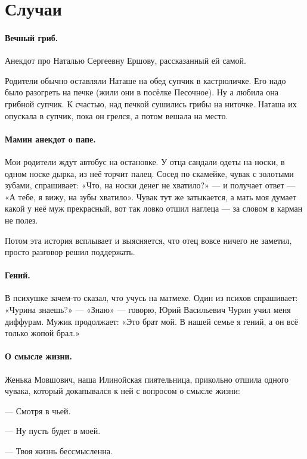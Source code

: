 \documentclass{book}
\begin{document}
\section*{Случаи}

\paragraph{Вечный гриб.}
Анекдот про Наталью Сергеевну Ершову, рассказанный ей самой.

Родители обычно оставляли Наташе на обед супчик в кастрюличке.
Его надо было разогреть на печке (жили они в посёлке Песочное).
Ну а любила она грибной супчик.
К счастью, над печкой сушились грибы на ниточке.
Наташа их опускала в супчик, пока он грелся, а потом вешала на место.

\paragraph{Мамин анекдот о папе.}
Мои родители ждут автобус на остановке.
У отца сандали одеты на носки, в одном носке дырка, из неё торчит палец.
Сосед по скамейке, чувак с золотыми зубами, спрашивает: «Что, на носки денег не хватило?» --- и получает ответ --- «А тебе, я вижу, на зубы хватило».
Чувак тут же затыкается, а мать моя думает какой у неё муж прекрасный, вот так ловко отшил наглеца --- за словом в карман не полез.

Потом эта история всплывает и выясняется, что отец вовсе ничего не заметил, просто разговор решил поддержать.

\paragraph{Гений.}
В психушке зачем-то сказал, что учусь на матмехе.
Один из психов спрашивает: «Чурина знаешь?» — «Знаю» — говорю, Юрий Васильевич Чурин учил меня диффурам.
Мужик продолжает: «Это брат мой. В нашей семье я гений, а он всё только жопой брал.»


\paragraph{О смысле жизни.}
Женька Мовшович, наша Илинойская пиятельница, прикольно отшила одного чувака, который докапывался к ней с вопросом о смысле жизни:

--- Смотря в чьей.

--- Ну пусть будет в моей.

--- Твоя жизнь бессмысленна.
\end{document}
